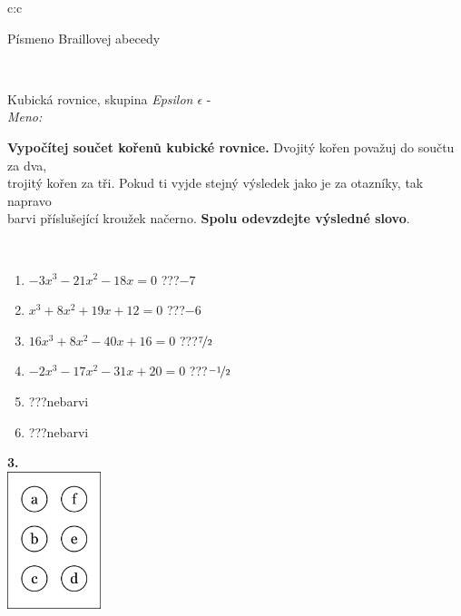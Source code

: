 \documentclass[10pt]{report}
\begin{document}
\begin{tabular}{c:c}
\begin{minipage}[c][104.5mm][t]{0.5\linewidth}
\begin{center}
\begin{minipage}{0.20\linewidth}
\begin{center}
{\small Písmeno Braillovej abecedy}
\end{center}
\end{minipage}
\end{center}
\end{minipage}
\\ \hdashline
\begin{minipage}[c][104.5mm][t]{0.5\linewidth}
\begin{center}
\vspace{7mm}
{\huge Kubická rovnice, skupina \textit{Epsilon $\epsilon$} -}\\[5mm]
\textit{Meno:}\phantom{xxxxxxxxxxxxxxxxxxxxxxxxxxxxxxxxxxxxxxxxxxxxxxxxxxxxxxxxxxxxxxxxx}\\[5mm]
\begin{minipage}{0.95\linewidth}
\textbf{Vypočítej součet kořenů kubické rovnice.} Dvojitý kořen považuj do součtu za dva,\\trojitý kořen za tři. Pokud ti vyjde stejný výsledek jako je za otazníky, tak napravo\\barvi příslušející kroužek načerno. \textbf{Spolu odevzdejte výsledné slovo}.
\end{minipage}
\\[1mm]
\begin{minipage}{0.79\linewidth}
\begin{center}
\begin{varwidth}{\linewidth}
\begin{enumerate}
\Large
\item $-3x^3-21x^2-18x=0$\quad \dotfill\; ???\;\dotfill \quad $-7$
\item $x^3+8x^2+19x+12=0$\quad \dotfill\; ???\;\dotfill \quad $-6$
\item $16x^3+8x^2-40x+16=0$\quad \dotfill\; ???\;\dotfill \quad $\nicefrac{7}{2}$
\item $-2x^3-17x^2-31x+20=0$\quad \dotfill\; ???\;\dotfill \quad $\nicefrac{-1}{2}$
\item \quad \dotfill\; ???\;\dotfill \quad nebarvi
\item \quad \dotfill\; ???\;\dotfill \quad nebarvi
\end{enumerate}
\end{varwidth}
\end{center}
\end{minipage}
\begin{minipage}{0.20\linewidth}
\begin{center}
{\Huge\bfseries 3.} \\[2mm]
\includegraphics[height=40mm]{../images/braille.png}

\end{center}
\end{minipage}
\end{center}
\end{minipage}
\end{tabular}
\end{document}
